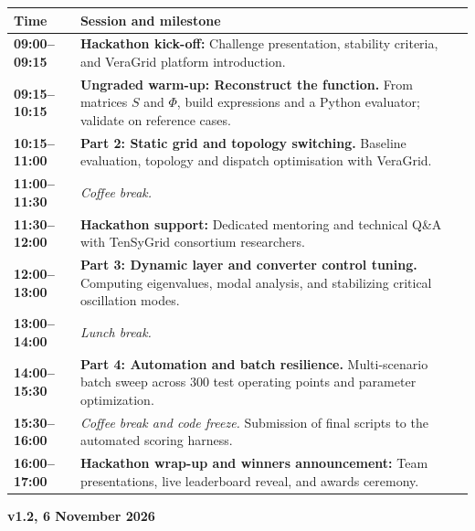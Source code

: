 \documentclass[11pt,a4paper]{article}
\newcommand{\eventversion}{v1.2, 6 November 2026}
\begin{document}
\small
\renewcommand{\arraystretch}{1.10}
\begin{tabularx}{\textwidth}{@{}p{26mm}X@{}}
  \toprule
  \textbf{\color{tgblue}Time} & \textbf{\color{tgblue}Session and milestone} \\
  \midrule
  \textbf{09:00--09:15} & \textbf{Hackathon kick-off:} Challenge presentation, stability criteria, and VeraGrid platform introduction. \\
  \textbf{09:15--10:15} & \textbf{Ungraded warm-up: Reconstruct the function.} From matrices $S$ and $\Phi$, build expressions and a Python evaluator; validate on reference cases. \\
  \textbf{10:15--11:00} & \textbf{Part 2: Static grid and topology switching.} Baseline evaluation, topology and dispatch optimisation with VeraGrid. \\
  \textbf{11:00--11:30} & \textit{\color{tgpetrol}Coffee break.} \\
  \textbf{11:30--12:00} & \textbf{Hackathon support:} Dedicated mentoring and technical Q\&A with TenSyGrid consortium researchers. \\
  \textbf{12:00--13:00} & \textbf{Part 3: Dynamic layer and converter control tuning.} Computing eigenvalues, modal analysis, and stabilizing critical oscillation modes. \\
  \textbf{13:00--14:00} & \textit{\color{tgpetrol}Lunch break.} \\
  \textbf{14:00--15:30} & \textbf{Part 4: Automation and batch resilience.} Multi-scenario batch sweep across 300 test operating points and parameter optimization. \\
  \textbf{15:30--16:00} & \textit{\color{tgpetrol}Coffee break and code freeze.} Submission of final scripts to the automated scoring harness. \\
  \textbf{16:00--17:00} & \textbf{Hackathon wrap-up and winners announcement:} Team presentations, live leaderboard reveal, and awards ceremony. \\
  \bottomrule
\end{tabularx}

\vfill
\hfill{\footnotesize\color{tggrey}\textbf{\eventversion}}
\end{document}
